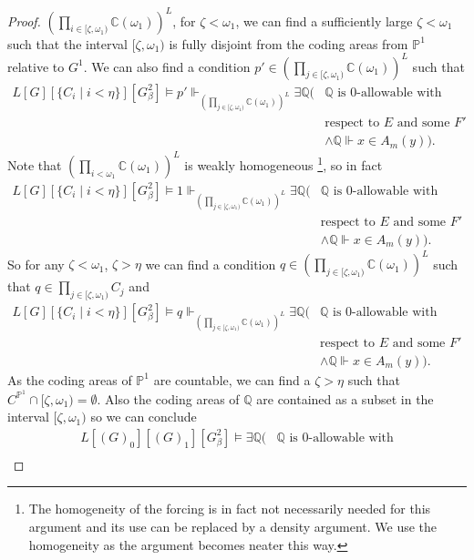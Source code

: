\documentclass[10pt,a4paper]{amsart}
\newcommand{\forceP}{\mathbb{P}}
\newcommand{\forceQ}{\mathbb{Q}}
\begin{document}
\begin{proof}
$(\prod_{ i \in [\zeta,\omega_1)} \mathbb{C} (\omega_1))^L$, for $\zeta < \omega_1$, we can find a sufficiently large $\zeta< \omega _1$ such that the interval $[\zeta, \omega_1)$ is fully disjoint from the coding areas from $\forceP^1$ relative to $G^1$. We can also find a condition $p' \in (\prod_{j \in [\zeta,\omega_1)} \mathbb{C} (\omega_1))^L$ such that 
\begin{align*}
L[G] [\{C_i \mid i < \eta \}] [G^2_{\beta}] \models p'  \Vdash_{(\prod_{j \in [\zeta,\omega_1)} \mathbb{C} (\omega_1))^L}  \exists \forceQ (&\forceQ \text{ is } 0 \text{-allowable with} \\&
\text{respect to } E \text{ and some $F'$ }  \\& \land \forceQ \Vdash {x} \in A_m({y})).
\end{align*}
Note that $(\prod_{i< \omega_1} \mathbb{C} (\omega_1))^L$ is weakly homogeneous \footnote{The homogeneity of the forcing is in fact not necessarily needed for this argument and its use can be replaced by a density argument. We use the homogeneity as the argument becomes neater this way.}, so in fact
\begin{align*}
L[G] [\{C_i \mid i < \eta \}] [G^2_{\beta}] \models 1  \Vdash_{(\prod_{j \in [\zeta,\omega_1)} \mathbb{C} (\omega_1))^L}  \exists \forceQ (&\forceQ \text{ is } 0 \text{-allowable with} \\&
\text{respect to } E \text{ and some $F'$}  \\& \land \forceQ \Vdash {x} \in A_m({y})).
\end{align*}
So for any $\zeta < \omega_1$, $\zeta > \eta$ we can find a condition $q \in (\prod_{j \in [\zeta,\omega_1) } \mathbb{C} (\omega_1))^L$ such that $q \in \prod_{j \in [\zeta,\omega_1) } C_j$ and
\begin{align*}
L[G] [\{C_i \mid i < \eta \}] [G^2_{\beta}] \models q  \Vdash_{(\prod_{j \in [\zeta,\omega_1)} \mathbb{C} (\omega_1))^L}  \exists \forceQ (&\forceQ \text{ is } 0 \text{-allowable with} \\&
\text{respect to } E \text{ and some $F'$ }  \\& \land \forceQ \Vdash {x} \in A_m({y})).
\end{align*}
As the coding areas of $\forceP^1$ are countable, we can find a $\zeta> \eta$ such that $C^{\forceP^1} \cap [\zeta, \omega_1) = \emptyset$. Also the coding areas of $\forceQ$ are contained as a subset in the interval $[\zeta,\omega_1)$ so we can conclude
\begin{align*}
L[(G)_0] [(G)_1] [G^2_{\beta}] \models  \exists \forceQ (&\forceQ \text{ is } 0 \text{-allowable with} \\&

\end{align*}
\end{proof}
\end{document}
